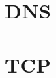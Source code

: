 \documentclass{article}
\begin{document}
\section{DNS}
\label{sec:DNS}


\section{TCP}
\label{sec:TCP}







\end{document}
